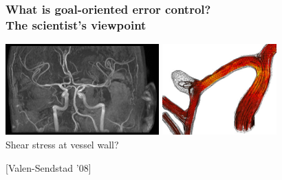 \begin{frame}
  \frametitle{What is goal-oriented error control? \\
    {\small The scientist's viewpoint}}
  \begin{center}
    \includegraphics[height=3.5cm]{png/circle_of_willis_scan.png} \hspace{0.3cm}
    \includegraphics[height=3.5cm]{png/circle_of_willis_aneurysm.png}
    \\
    \vspace{3.0em}
    Shear stress at vessel wall?
  \end{center}
\btVFill
{\tiny [Valen-Sendstad '08]}
\end{frame}

